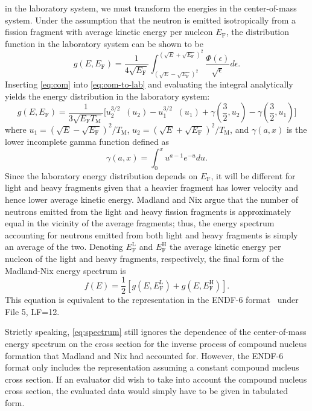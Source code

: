 \documentclass[3p,fleqn]{elsarticle}
\DeclareMathOperator\expint{E_1}
\newcommand{\tmax}{T_{\mathrm{M}}}
\newcommand{\ef}{E_{\mathrm{F}}}
\newcommand{\efl}{E_{\mathrm{F}}^{\mathrm{L}}}
\newcommand{\efh}{E_{\mathrm{F}}^{\mathrm{H}}}
\begin{document}
in the laboratory system, we must transform the energies in the center-of-mass
system. Under the assumption that the neutron is emitted isotropically from a
fission fragment with average kinetic energy per nucleon $\ef$, the distribution
function in the laboratory system can be shown to be~\cite{physrev-terrell-1959}
\begin{equation}
  g(E,\ef) = \frac{1}{4\sqrt{\ef}} \int_{\left( \sqrt{E} - \sqrt{\ef}
    \right)^2}^{\left( \sqrt{E} + \sqrt{\ef} \right)^2}
  \frac{\Phi(\epsilon)}{\sqrt{\epsilon}} d\epsilon.
  \label{eq:com-to-lab}
\end{equation}
Inserting \autoref{eq:com} into \autoref{eq:com-to-lab} and evaluating the integral
analytically yields the energy distribution in the laboratory system:
\begin{equation}
  g(E,\ef) = \frac{1}{3\sqrt{\ef \tmax}} \bigg [ u_2^{3/2} \expint (u_2) -
    u_1^{3/2} \expint (u_1) + \gamma \left( \frac{3}{2}, u_2 \right ) -
    \gamma \left( \frac{3}{2}, u_1 \right) \bigg ]
\end{equation}
where $u_1 = \left ( \sqrt{E} - \sqrt{\ef} \right )^2/\tmax$, $u_2 = \left (
\sqrt{E} + \sqrt{\ef} \right)^2/\tmax$, and $\gamma(a,x)$ is the lower incomplete
gamma function defined as
\begin{equation*}
  \gamma(a,x) = \int_0^x u^{a-1} e^{-u} du.
\end{equation*}
Since the laboratory energy distribution depends on $\ef$, it will be different
for light and heavy fragments given that a heavier fragment has lower velocity
and hence lower average kinetic energy. Madland and Nix argue that the number of
neutrons emitted from the light and heavy fission fragments is approximately
equal in the vicinity of the average fragments; thus, the energy spectrum
accounting for neutrons emitted from both light and heavy fragments is simply an
average of the two. Denoting $\efl$ and $\efh$ the average kinetic energy per
nucleon of the light and heavy fragments, respectively, the final form of the
Madland-Nix energy spectrum is
\begin{equation}
  \label{eq:spectrum}
  f(E) = \frac{1}{2} \left [ g(E, \efl) + g(E, \efh) \right ].
\end{equation}
This equation is equivalent to the representation in the ENDF-6
format~\cite{bnl-trkov-2012} under File 5, LF=12.

Strictly speaking, \autoref{eq:spectrum} still ignores the dependence of the
center-of-mass energy spectrum on the cross section for the inverse process of
compound nucleus formation that Madland and Nix had accounted for. However, the
ENDF-6 format only includes the representation assuming a constant compound
nucleus cross section. If an evaluator did wish to take into account the
compound nucleus cross section, the evaluated data would simply have to be given
in tabulated form.
\end{document}
